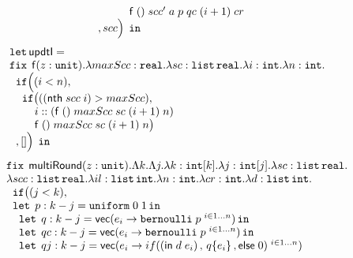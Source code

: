 \begin{figure}
\[\begin{array}{l}
 \hspace{1.2cm} \mathsf{f}  \; () \; scc' \; a \; p \; qc
                \; (i+1) \;  cr  \\ 
 \hspace{0.2cm} , scc  \Big ) \; \mathop{ \mathtt{in}}
\end{array}
\]
%
%
\[
\begin{array}{l}
\mathop{\mathtt{let}} \mathsf{updtI} = \\
                 \mathop{\mathtt{fix}} \;  \mathsf{f}(z : \mathtt{unit}). \lambda maxScc: \mathtt{real}. 
                 \lambda sc: \mathtt{list} \, \mathtt{real}. \lambda i: \mathtt{int}. \lambda n: \mathtt{int}. \\
 \hspace{.2cm}   \mathtt{if} \Big (   (i < n)  ,  \\
 \hspace{0.4cm}  \mathtt{if} \big( ( ( \mathsf{nth} \; scc \; i)  >  maxScc  ) ,       \\
 \hspace{0.8cm}  i :: ( \mathsf{f}  \; () \; maxScc \; sc
                 \; (i+1) \; n  )\\
 \hspace{0.8cm}  \mathsf{f}  \; () \; maxScc \; sc
                 \; (i+1) \; n  \big )  \\
 \hspace{0.2cm}  , [] \Big ) \; \mathop{ \mathtt{in}}
\end{array}
\]
%
%
\[
\begin{array}{l}
 \mathop{\mathtt{fix}} \;  \mathsf{multiRound}(z : \mathtt{unit}). \Lambda k. \Lambda j. 
        \lambda k: \mathtt{int}[k]. \lambda j: \mathtt{int}[j]. \lambda sc: \mathtt{list} \, \mathtt{real}.\\
        \lambda scc: \mathtt{list} \, \mathtt{real}. \lambda il: \mathtt{list} \, \mathtt{int}. \lambda n: \mathtt{int}.
        \lambda cr: \mathtt{int}. \lambda d: \mathtt{list} \, \mathtt{int}.\\
 \hspace{.2cm}  \mathtt{if}   \big (   (j < k)  ,  \\
 \hspace{.2cm}  \mathop{\mathtt{let}} \; p: k - j = \mathtt{uniform} \; 0 \; 1 \mathop{ \mathtt{in}} \\
 \hspace{0.4cm} \mathop{\mathtt{let}} \; q: k - j = 
   \mathsf{vec}(e_i \to \mathtt{bernoulli} \; p^{\, \, i \in 1\dots n}) \mathop{ \mathtt{in}} \\
 \hspace{0.4cm} \mathop{\mathtt{let}} \; qc: k - j = \mathsf{vec}(e_i \to \mathtt{bernoulli} \; p^{\, \, i \in 1\dots n}) \mathop{ \mathtt{in}} \\
 \hspace{0.4cm} \mathop{\mathtt{let}} \; qj : k - j = \mathsf{vec}( e_i \to if( (\mathsf{in}\; d \; e_i) \, , \, q\{e_i\} \,, \mathsf{else}\; 0)^{\, \, i \in 1\dots n} )\\

\end{array}\]
\end{figure}
